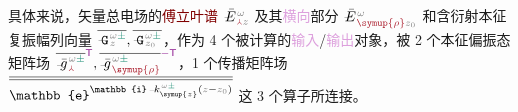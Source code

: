 具体来说，\textcolor{PineGreen}{矢量总电场}的\textcolor{Maroon}{傅立叶谱} $\Xint{\mathcolor{gray}{-}}{25}{\bar{E}}^{\;\!\mathcolor{gray}{\omega}}_{\;\! \textcolor{Maroon}{\Yup} \mathcolor{gray}{z}}$ 及其\textcolor{Plum}{横向}部分 $\Xint{\mathcolor{gray}{-}}{25}{\bar{E}}^{\;\!\mathcolor{gray}{\omega}}_{\;\! \textcolor{Maroon}{\symup{\rho}} \mathcolor{gray}{z_0}}$ 和\textcolor{PineGreen}{含衍射本征复振幅}列向量 $\overline{\Xint{\mathcolor{gray}{-}}{16}{\mathtt{G}}^{\;\!\mathcolor{gray}{\omega} \textcolor{PineGreen}{\pm}}_{\;\! \mathcolor{gray}{z}}},\overline{\Xint{\mathcolor{gray}{-}}{16}{\mathtt{G}}^{\;\!\mathcolor{gray}{\omega} \textcolor{PineGreen}{\pm}}_{\;\! \mathcolor{gray}{z_0}}}$，作为 4 个被计算的\textcolor{Plum}{输入}/\textcolor{Plum}{输出}对象，被 2 个\textcolor{PineGreen}{本征偏振态矩阵场} $\overline{\Xint{{}^{}_{\mathcolor{gray}{-}}}{10}{\bar{g}}^{\;\!\mathcolor{gray}{\omega} \textcolor{PineGreen}{\pm}}_{\;\! \textcolor{Maroon}{\Yup}}}^{\mathsf{\textcolor{Plum}{T}}}, \overline{\Xint{{}^{}_{\mathcolor{gray}{-}}}{10}{\bar{g}}^{\;\!\mathcolor{gray}{\omega} \textcolor{PineGreen}{\pm}}_{\;\! \textcolor{Maroon}{\symup{\rho}}}}^{\textcolor{Plum}{-\mathsf{T}}}$，1 个\textcolor{PineGreen}{传播矩阵场} $\overline{\overline{\mathbb{e}^{\mathbb{i} \Xint{\begin{smallmatrix} ~ \\ {}^{}_{\mathcolor{gray}{-}} \\ ~ \end{smallmatrix}}{15}{k}_{\symup{z}}^{\;\! \mathcolor{gray}{\omega} \textcolor{PineGreen}{\pm}} \left( \mathcolor{gray}{z} - \mathcolor{gray}{z_0} \right)}}}$ 这 3 个算子所连接。

\clearpage

